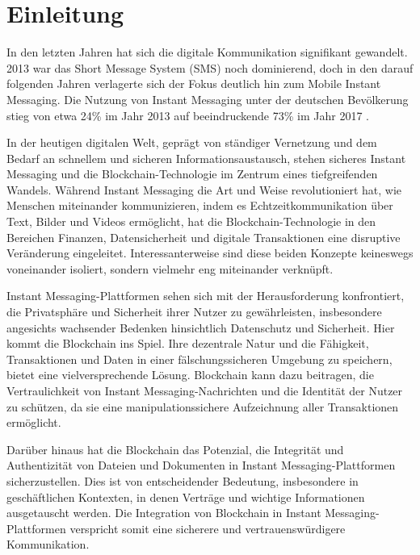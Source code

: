 \chapter{Einleitung}


In den letzten Jahren hat sich die digitale Kommunikation signifikant gewandelt. 2013 war das Short Message System (SMS) noch dominierend, doch in den darauf folgenden Jahren verlagerte sich der Fokus deutlich hin zum Mobile Instant Messaging. Die Nutzung von Instant Messaging unter der deutschen Bevölkerung stieg von etwa 24\% im Jahr 2013 auf beeindruckende 73\% im Jahr 2017 \parencite{Hedda_digiKommunikationVeraendert}.

In der heutigen digitalen Welt, geprägt von ständiger Vernetzung und dem Bedarf an schnellem und sicheren Informationsaustausch, stehen sicheres Instant Messaging und die Blockchain-Technologie im Zentrum eines tiefgreifenden Wandels. Während Instant Messaging die Art und Weise revolutioniert hat, wie Menschen miteinander kommunizieren, indem es Echtzeitkommunikation über Text, Bilder und Videos ermöglicht, hat die Blockchain-Technologie in den Bereichen Finanzen, Datensicherheit und digitale Transaktionen eine disruptive Veränderung eingeleitet. Interessanterweise sind diese beiden Konzepte keineswegs voneinander isoliert, sondern vielmehr eng miteinander verknüpft.

Instant Messaging-Plattformen sehen sich mit der Herausforderung konfrontiert, die Privatsphäre und Sicherheit ihrer Nutzer zu gewährleisten, insbesondere angesichts wachsender Bedenken hinsichtlich Datenschutz und Sicherheit. Hier kommt die Blockchain ins Spiel. Ihre dezentrale Natur und die Fähigkeit, Transaktionen und Daten in einer fälschungssicheren Umgebung zu speichern, bietet eine vielversprechende Lösung. Blockchain kann dazu beitragen, die Vertraulichkeit von Instant Messaging-Nachrichten und die Identität der Nutzer zu schützen, da sie eine manipulationssichere Aufzeichnung aller Transaktionen ermöglicht. 

Darüber hinaus hat die Blockchain das Potenzial, die Integrität und Authentizität von Dateien und Dokumenten in Instant Messaging-Plattformen sicherzustellen. Dies ist von entscheidender Bedeutung, insbesondere in geschäftlichen Kontexten, in denen Verträge und wichtige Informationen ausgetauscht werden. Die Integration von Blockchain in Instant Messaging-Plattformen verspricht somit eine sicherere und vertrauenswürdigere Kommunikation.

